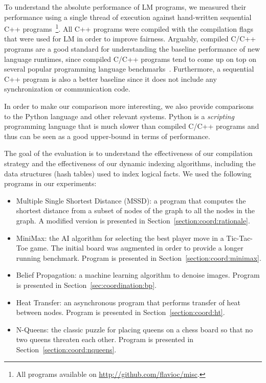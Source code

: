 To understand the absolute performance of LM programs, we measured their
performance using a single thread of execution against
hand-written sequential C++ programs~\footnote{All programs available on
\url{http://github.com/flavioc/misc}.}. All C++ programs were compiled with the
compilation flags that were used for LM in order to improve fairness. Arguably,
compiled C/C++ programs are a good standard for understanding the baseline
performance of new language runtimes, since compiled C/C++ programs tend to come
up on top on several popular programming language
benchmarks~\cite{language_benchmarks}. Furthermore, a sequential C++ program is
also a better baseline since it does not include any synchronization or
communication code.

In order to make our comparison more interesting, we also provide comparisons to
the Python language and other relevant systems. Python is a \emph{scripting}
programming language that is much slower than compiled C/C++ programs and thus
can be seen as a good upper-bound in terms of performance.

The goal of the evaluation is to understand the effectiveness of our compilation
strategy and the effectiveness of our dynamic indexing algorithms, including the
data structures (hash tables) used to index logical facts. We used the following
programs in our experiments:

\begin{itemize}
   \item Multiple Single Shortest Distance (MSSD): a program that computes the
      shortest distance from a subset of nodes of the graph to all the nodes
      in the graph. A modified version is presented in
      Section~\ref{section:coord:rationale}.

      
    \item MiniMax: the AI algorithm for selecting the best player move in a
       Tic-Tac-Toe game. The initial board was augmented in order to provide a
       longer running benchmark. Program is presented in
       Section~\ref{section:coord:minimax}.

   \item Belief Propagation: a machine learning algorithm to denoise images. Program is
      presented in Section~\ref{sec:coordination:bp}.

    \item Heat Transfer: an asynchronous program that performs transfer of heat
       between nodes. Program is presented in Section~\ref{section:coord:ht}.

   \item N-Queens: the classic puzzle for placing queens on a chess board so
      that no two queens threaten each other. Program is presented in
      Section~\ref{section:coord:nqueens}.

\end{itemize}

